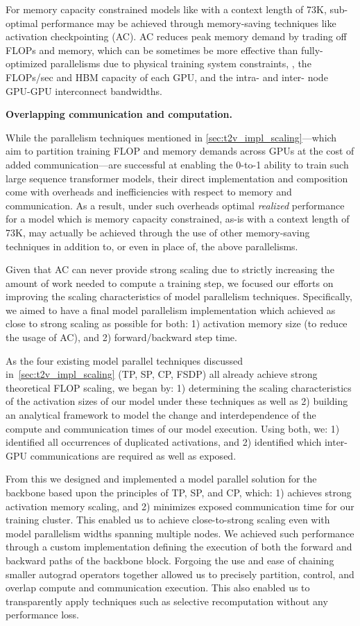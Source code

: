 For memory capacity constrained models like \OursVideo with a context length of 73K, sub-optimal performance may be achieved through memory-saving techniques like activation checkpointing (AC).
AC reduces peak memory demand by trading off FLOPs and memory, which can be sometimes be more effective than fully-optimized parallelisms due to physical training system constraints, \eg, the FLOPs/sec and HBM capacity of each GPU, and the intra- and inter- node GPU-GPU interconnect bandwidths.

\noindent \textbf{Overlapping communication and computation.}

While the parallelism techniques mentioned in \cref{sec:t2v_impl_scaling}—which aim to partition training FLOP and memory demands across GPUs at the cost of added communication—are successful at enabling the 0-to-1 ability to train such large sequence transformer models, their direct implementation and composition come with overheads and inefficiencies with respect to memory and communication. As a result, under such overheads optimal \textit{realized} performance for a model which is memory capacity constrained, as-is \OursVideo with a context length of 73K, may actually be achieved through the use of other memory-saving techniques in addition to, or even in place of, the above parallelisms.

Given that AC can never provide strong scaling due to strictly increasing the amount of work needed to compute a training step, we focused our efforts on improving the scaling characteristics of model parallelism techniques. Specifically, we aimed to have a final model parallelism implementation which achieved as close to strong scaling as possible for both: 1) activation memory size (to reduce the usage of AC), and 2) forward/backward step time.

As the four existing model parallel techniques discussed in~\cref{sec:t2v_impl_scaling} (TP, SP, CP, FSDP) all already achieve strong theoretical FLOP scaling, we began by: 1) determining the scaling characteristics of the activation sizes of our model under these techniques as well as 2) building an analytical framework to model the change and interdependence of the compute and communication times of our model execution. Using both, we: 1) identified all occurrences of duplicated activations, and 2) identified which inter-GPU communications are required as well as exposed.

From this we designed and implemented a model parallel solution for the \OursVideo backbone based upon the principles of TP, SP, and CP, which: 1) achieves strong activation memory scaling, and 2) minimizes exposed communication time for our training cluster. This enabled us to achieve close-to-strong scaling even with model parallelism widths spanning multiple nodes. We achieved such performance through a custom implementation defining the execution of both the forward and backward paths of the \OursVideo backbone block. Forgoing the use and ease of chaining smaller autograd operators together allowed us to precisely partition, control, and overlap compute and communication execution. This also enabled us to transparently apply techniques such as selective recomputation without any performance loss.

